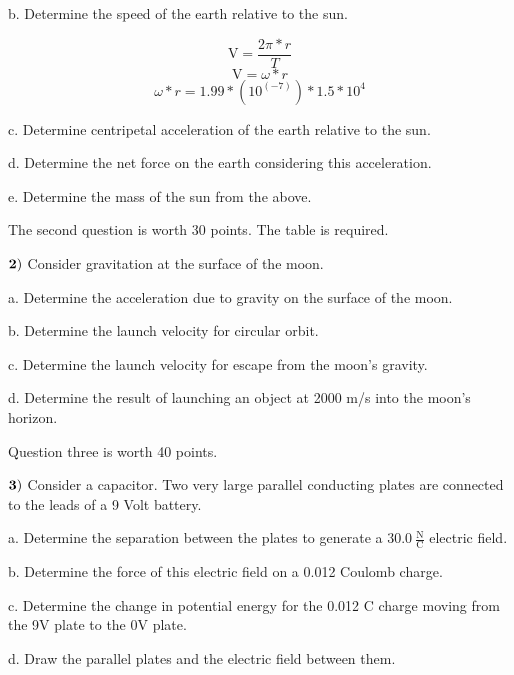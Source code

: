 \documentclass{article}
\begin{document}
 
 b.  Determine the speed of the earth relative to the sun.
 
 $$\text{V}=\frac{2\pi*r}{T}$$
 $$\text{V}=\omega*r$$
 $$\omega*r=1.99*(10^(-7))*1.5*10^4$$

  \vspace{3.5cm}
  
 c.  Determine centripetal acceleration of the earth relative to the sun.
 
  \vspace{3.5cm}
 
 d. Determine the net force on the earth considering this acceleration.
 
  \vspace{3.5cm}
 
 e. Determine the mass of the sun from the above.
 
  
 
 


  \newpage
  The second question is worth 30 points.  The table is required.
  
 $\bf{2)}$  Consider gravitation at the surface of the moon.
 
 \vspace{1cm}

  
 a.  Determine the acceleration due to gravity on the surface of the moon.
   \vspace{4.5cm}
 
 b.  Determine the launch velocity for circular orbit.
   \vspace{4.5cm}
 
 c.  Determine the launch velocity for escape from the moon's gravity.
   \vspace{4.5cm}
 
 d.  Determine the result of launching an object at 2000 m/s into the moon's horizon.
 

  \newpage

Question three is worth 40 points.

  $\bf{3)}$  Consider a capacitor.  Two very large parallel conducting plates are connected to the leads of a 9 Volt battery.
  \vspace{0.5cm}
  
  a.  Determine the separation between the plates to generate a $30.0\  \frac{\text{N}}{\text{C}}$ electric field.
    \vspace{4.5cm}
  
  b.  Determine the force of this electric field on a 0.012 Coulomb charge.
    \vspace{4.5cm}
  
  c.  Determine the change in potential energy for the 0.012 C charge moving from the 9V plate to the 0V plate.
    \vspace{4.5cm}
  
  d. Draw the parallel plates and the electric field between them.  
  
  
 
\end{document}
